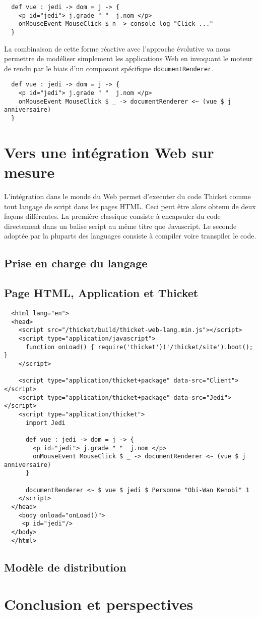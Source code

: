 \documentclass[twoside,a4paper]{article}
\begin{document}
\begin{lstlisting}
  def vue : jedi -> dom = j -> {
    <p id="jedi"> j.grade " "  j.nom </p> 
    onMouseEvent MouseClick $ n -> console log "Click ..."
  }
\end{lstlisting}

La combinaison  de cette forme  réactive avec l'approche  évolutive va
nous  permettre  de  modéliser  simplement  les  applications  Web  en
invoquant le  moteur de rendu  par le biais d'un  composant spécifique
{\tt documentRenderer}.

\begin{lstlisting}
  def vue : jedi -> dom = j -> {
    <p id="jedi"> j.grade " "  j.nom </p> 
    onMouseEvent MouseClick $ _ -> documentRenderer <~ (vue $ j anniversaire)
  }
\end{lstlisting}

\section{Vers une intégration Web sur mesure}

L'intégration dans le  monde du Web permet d'executer  du code Thicket
comme tout langage de script dans les pages HTML. Ceci peut être alors
obtenu de deux  façons différentes.  La première  classique consiste à
encapsuler du code directement dans un balise script au même titre que
Javascript. Le seconde adoptée par  la pluparts des languages consiste
à compiler voire transpiler le code.

\subsection{Prise en charge du langage}

\subsection{Page HTML, Application et Thicket}

\lstset{language=Html}
\begin{lstlisting}
  <html lang="en">
  <head>
    <script src="/thicket/build/thicket-web-lang.min.js"></script>    
    <script type="application/javascript">
      function onLoad() { require('thicket')('/thicket/site').boot(); }
    </script>

    <script type="application/thicket+package" data-src="Client"></script>
    <script type="application/thicket+package" data-src="Jedi"></script>
    <script type="application/thicket">
      import Jedi

      def vue : jedi -> dom = j -> {
        <p id="jedi"> j.grade " "  j.nom </p> 
        onMouseEvent MouseClick $ _ -> documentRenderer <~ (vue $ j anniversaire)
      }

      documentRenderer <~ $ vue $ jedi $ Personne "Obi-Wan Kenobi" 1
    </script>
  </head>        
    <body onload="onLoad()">
     <p id="jedi"/>
  </body>
  </html>
\end{lstlisting}

\subsection{Modèle de distribution}

\section{Conclusion et perspectives}



\end{document}
